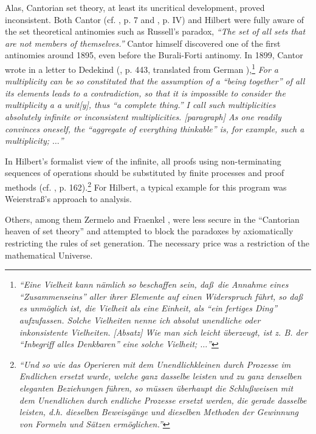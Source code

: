 Alas, Cantorian set theory, at least its uncritical development, proved
inconsistent.
Both Cantor
(cf.
\cite{zer-fr}, p. 7 and \cite{cantor}, p. IV)
and Hilbert were fully aware of the set theoretical antinomies such as
Russell's paradox,  {\em ``The set of all
sets that are not members of themselves.''}
Cantor himself  discovered one of the first antinomies around 1895, even
before the Burali-Forti antinomy. In 1899, Cantor wrote in a letter to
Dedekind
(\cite{cantor}, p. 443, translated from German
\cite{boos}),\footnote{
{\em ``Eine Vielheit kann n\"amlich so beschaffen sein, da\ss $\,$ die
Annahme eines ``Zusammenseins'' {\em aller} ihrer Elemente auf einen
Widerspruch f\"uhrt, so da\ss $\,$ es unm\"oglich ist, die Vielheit als
eine Einheit, als ``ein fertiges Ding'' aufzufassen. Solche Vielheiten
nenne ich {\em absolut unendliche} oder {\em inkonsistente Vielheiten.}
[Absatz]
Wie man sich leicht \"uberzeugt, ist z. B.  der ``Inbegriff alles
Denkbaren'' eine solche Vielheit; $\ldots$''
}}
{\em For a multiplicity can be so constituted that the assumption of a
``being together'' of {\em all} its elements leads to a contradiction,
so that it is impossible to consider the multiplicity a a unit[y], thus
``a complete thing.'' I call such multiplicities {\em absolutely
infinite} or inconsistent multiplicities.
[paragraph]
As one readily convinces oneself, the ``aggregate of everything
thinkable'' is, for example, such a multiplicity; $\ldots$''}

In Hilbert's formalist view of the infinite,
all proofs
using non-terminating sequences of operations should be
substituted by finite processes and proof methods
(cf. \cite{hil-26}, p. 162).\footnote{
{\em ``Und so wie das Operieren mit dem Unendlichkleinen durch Prozesse
im Endlichen ersetzt wurde, welche ganz dasselbe leisten und zu
ganz denselben eleganten Beziehungen f\"uhren, so m\"ussen \"uberhaupt
die Schlu\ss weisen mit dem Unendlichen durch endliche Prozesse
ersetzt werden, die gerade dasselbe leisten, d.h. dieselben
Beweisg\"ange und dieselben Methoden der Gewinnung von Formeln und
S\"atzen erm\"oglichen.''}}
For Hilbert, a typical example for this program
was Weierstra\ss 's approach to analysis.



Others, among them Zermelo and Fraenkel \cite{zer-fr}, were less secure
in the
``Cantorian heaven of set theory'' and attempted to block the paradoxes
by axiomatically
restricting the rules of set generation.
The necessary price was a restriction of the mathematical Universe.

